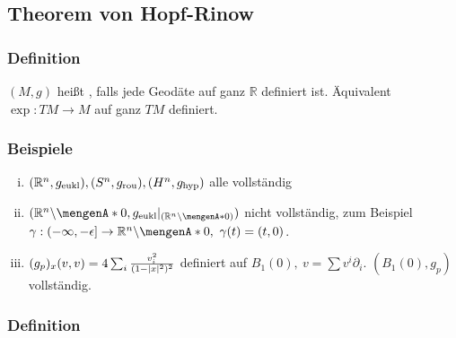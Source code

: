 
\subsection{Theorem von Hopf-Rinow}
\label{sub:26}

\subsubsection{Definition}
\label{ssub:251}
$(M,g)$ heißt , falls jede Geodäte auf ganz $\mathds{R}$ definiert ist. Äquivalent $\exp: TM\to M$ auf ganz $TM$ definiert.

\subsubsection{Beispiele}
\label{ssub:252}
\begin{enumerate}[(i)]
\item $(\mathbb{R}^n,g_{\text{eukl}}),(S^n,g_{\text{rou}}),(H^n,g_{\text{hyp}})$ alle vollständig
\item $\enbrace{\mathds{R}^n\backslash \set{0},g_{\text{eukl}}\vert_{\enbrace{\mathds{R}^n\backslash \set{0}}}}$ nicht vollständig, zum Beispiel $\gamma:(-\infty,-\epsilon] \to \mathds{R}^n\backslash \set{0},\ \gamma(t) = (t,0)$.
\item $(g_p)_x (v,v) = 4\sum_i \frac{v_i^2}{(1-\lvert x\rvert^2)^2}$ definiert  auf $B_1(0),\ v=\sum v^i \partial_i$. $(B_1(0),g_p)$ vollständig.
\end{enumerate}

\subsubsection{Definition}
\label{ssub:251}



\cleardoubleoddemptypage
{}
\setcounter{page}{1}
\printindex
\listoffigures

